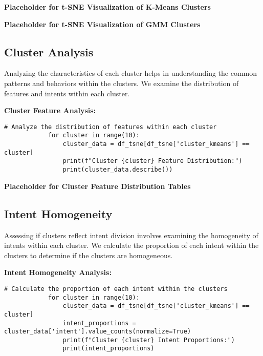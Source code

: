         \textbf{Placeholder for t-SNE Visualization of K-Means Clusters}

        \textbf{Placeholder for t-SNE Visualization of GMM Clusters}
            
    \subsection{Cluster Analysis}
    
        Analyzing the characteristics of each cluster helps in understanding the common patterns and behaviors within the clusters. We examine the distribution of features and intents within each cluster.

        \textbf{Cluster Feature Analysis:}
        
        \vspace{0.5em}

        \begin{lstlisting}[caption={Feature Distribution Analysis by Cluster}, label={lst:feature_distribution}]
            # Analyze the distribution of features within each cluster
            for cluster in range(10):
                cluster_data = df_tsne[df_tsne['cluster_kmeans'] == cluster]
                print(f"Cluster {cluster} Feature Distribution:")
                print(cluster_data.describe())
        \end{lstlisting}

        \textbf{Placeholder for Cluster Feature Distribution Tables}
            
    \subsection{Intent Homogeneity}
    
        Assessing if clusters reflect intent division involves examining the homogeneity of intents within each cluster. We calculate the proportion of each intent within the clusters to determine if the clusters are homogeneous.

        \textbf{Intent Homogeneity Analysis:}
        
        \vspace{0.5em}

        \begin{lstlisting}[caption={Intent Proportions Analysis by Cluster}, label={lst:intent_proportions}]
            # Calculate the proportion of each intent within the clusters
            for cluster in range(10):
                cluster_data = df_tsne[df_tsne['cluster_kmeans'] == cluster]
                intent_proportions = cluster_data['intent'].value_counts(normalize=True)
                print(f"Cluster {cluster} Intent Proportions:")
                print(intent_proportions)
        \end{lstlisting}

